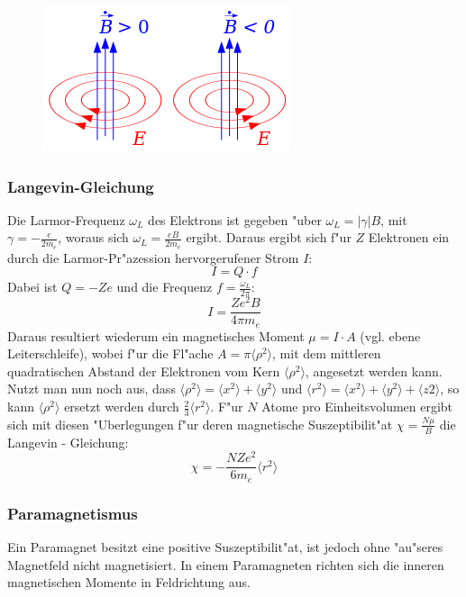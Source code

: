             \begin{figure}[H]
                \centering
                \includegraphics{Images/lenzRegel.png}
                \label{figLenz}
            \end{figure}
        \subsubsection*{Langevin-Gleichung}
        Die Larmor-Frequenz $\omega_L$ des Elektrons ist gegeben "uber $\omega_L = |\gamma | B$, mit $\gamma = -\frac{e}{2m_e}$, woraus sich $\omega_L = \frac{eB}{2m_e}$ ergibt. Daraus ergibt sich f"ur $Z$ Elektronen ein durch die Larmor-Pr"azession hervorgerufener Strom $I$:
        \begin{equation}
        	I = Q \cdot f
        \end{equation}
        Dabei ist $Q = -Ze$ und die Frequenz $f = \frac{\omega_L}{2\pi}$:
        \begin{equation}
        	I = \frac{Ze^2 B}{4\pi m_e}
        \end{equation}
Daraus resultiert wiederum ein magnetisches Moment $\mu = I \cdot A$ (vgl. ebene Leiterschleife), wobei f"ur die Fl"ache $A = \pi \langle \rho^2 \rangle$, mit dem mittleren quadratischen Abstand der Elektronen vom Kern $\langle \rho^2 \rangle$, angesetzt werden kann.\\
Nutzt man nun noch aus, dass $\langle \rho^2 \rangle = \langle x^2 \rangle + \langle y^2 \rangle$ und $\langle r^2 \rangle = \langle x^2 \rangle + \langle y^2 \rangle + \langle z2 \rangle$, so kann $\langle \rho^2 \rangle$ ersetzt werden durch $\frac{2}{3} \langle r^2 \rangle$. F"ur $N$ Atome pro Einheitsvolumen ergibt sich mit diesen "Uberlegungen f"ur deren magnetische Suszeptibilit"at $\chi = \frac{N\mu}{B}$ die Langevin - Gleichung:
	\begin{equation}
		\chi = - \frac{NZe^2}{6m_e} \langle r^2 \rangle
	\end{equation}
        \subsubsection*{Paramagnetismus}
            Ein Paramagnet besitzt eine positive Suszeptibilit"at, ist jedoch ohne "au"seres
            Magnetfeld nicht magnetisiert. In einem Paramagneten richten sich die inneren magnetischen Momente
            in Feldrichtung aus.
